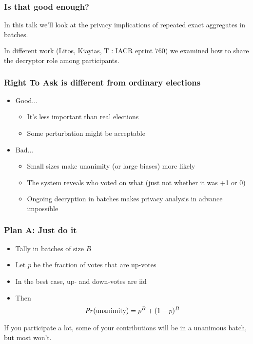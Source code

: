 \documentclass[10pt,xcolor=svgnames,169]{beamer} %
\begin{document}
	\begin{frame}
	\frametitle{Is that good enough?}	
		
	In this talk we'll look at the privacy implications of repeated exact aggregates in batches.
	
	In different work (Litos, Kiayias, T : IACR eprint 760) we examined how to share
	the decryptor role among participants.
	\end{frame}	
	

	
	\begin{frame}
	\frametitle{Right To Ask is different from ordinary elections}	
	
\begin{itemize}

	\item Good...
	\begin{itemize}
	\item It's less important than real elections
	\item Some perturbation might be acceptable
	\end{itemize}
	\item Bad...
\begin{itemize}
	\item Small sizes make unanimity (or large biases) more likely
	\item The system reveals who voted on what (just not whether it was +1 or 0)
	\item Ongoing decryption in batches makes privacy analysis in advance impossible
\end{itemize}
\end{itemize}
\end{frame}	

\begin{frame}
	\frametitle{Plan A: Just do it}
	\begin{itemize}
		\item 	Tally in batches of size $B$
		\item Let  $p$ be the fraction of votes that are up-votes
		\item In the best case, up- and down-votes are iid 
		\item Then $$\mathit{Pr}(\text{unanimity}) = p^B + (1-p)^B$$
		\end{itemize}

	
If you participate a lot, some of your contributions will be in a unanimous batch, but most won't.

\end{frame}
\end{document}
